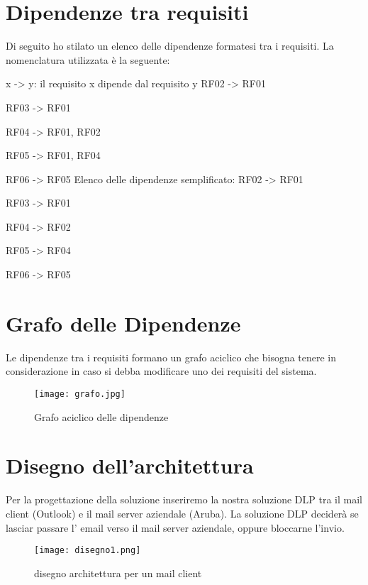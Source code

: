 \section{Dipendenze tra requisiti}
Di seguito ho stilato un elenco delle dipendenze formatesi tra i requisiti.
La nomenclatura utilizzata è la seguente:
\begin{flushleft}
  x -> y: il requisito x dipende dal requisito y
  \newline
  \newline
  RF02 -> RF01

  RF03 -> RF01

  RF04 -> RF01, RF02

  RF05 -> RF01, RF04

  RF06 -> RF05
  \newline
  \newline
  Elenco delle dipendenze semplificato: 
  \newline
  \newline
  RF02 -> RF01

  RF03 -> RF01

  RF04 -> RF02

  RF05 -> RF04 
  
  RF06 -> RF05
\end{flushleft}

\newpage
\section{Grafo delle Dipendenze}
Le dipendenze tra i requisiti formano un grafo aciclico che bisogna tenere in considerazione in caso si debba modificare uno dei requisiti del sistema.

\begin{figure}[htp]
  \centering
  \texttt{[image: grafo.jpg]}
  \caption{Grafo aciclico delle dipendenze}\label{grafoDipendenze}
\end{figure}

\section{Disegno dell'architettura}

Per la progettazione della soluzione inseriremo la nostra soluzione DLP
tra il mail client (Outlook) e il mail server aziendale (Aruba). La soluzione DLP deciderà se lasciar 
passare l' email verso il mail server aziendale, oppure bloccarne l'invio.
\begin{figure}[htp]
  \centering
  \texttt{[image: disegno1.png]}
  \caption{disegno architettura per un mail client}\label{disegno1}
\end{figure}


